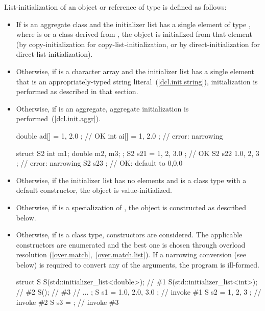 \pnum
List-initialization of an object or reference of type  is defined as follows:
\begin{itemize}

\item If  is an aggregate class and the initializer list has a single element
of type  ,
where  is  or a class derived from ,
the object is initialized from that element (by copy-initialization for
copy-list-initialization, or by direct-initialization for
direct-list-initialization).

\item Otherwise, if  is a character array and the initializer list has a
single element that is an appropriately-typed string literal~(\ref{dcl.init.string}),
initialization is performed as described in that section.

\item Otherwise, if  is an aggregate, aggregate initialization is
performed~(\ref{dcl.init.aggr}).

\begin{example}
\begin{codeblock}
double ad[] = { 1, 2.0 };           // OK
int ai[] = { 1, 2.0 };              // error: narrowing

struct S2 {
  int m1;
  double m2, m3;
};
S2 s21 = { 1, 2, 3.0 };             // OK
S2 s22 { 1.0, 2, 3 };               // error: narrowing
S2 s23 { };                         // OK: default to 0,0,0
\end{codeblock}
\end{example}

\item Otherwise, if the initializer list has no elements and  is a class type with a
default constructor, the object is value-initialized.

\item Otherwise, if  is a specialization of ,
the object is constructed as described below.

\item Otherwise, if  is a class type, constructors are considered.
The applicable constructors are enumerated and
the best one is chosen through overload resolution (\ref{over.match},~\ref{over.match.list}). If a narrowing
conversion (see below) is required to convert any of the arguments, the program is
ill-formed.

\begin{example}
\begin{codeblock}
struct S {
  S(std::initializer_list<double>); // \#1
  S(std::initializer_list<int>);    // \#2
  S();                              // \#3
  // ...
};
S s1 = { 1.0, 2.0, 3.0 };           // invoke \#1
S s2 = { 1, 2, 3 };                 // invoke \#2
S s3 = { };                         // invoke \#3
\end{codeblock}
\end{example}


\end{itemize}
